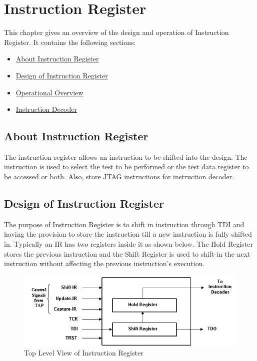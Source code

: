 \chapter{Instruction Register}
\label{chap:instruction-reg}
This chapter gives an overview of the design and operation of Instruction Register. It contains the following sections:
\begin{itemize}
    \item \hyperref[sec:about-instruction-reg]{About Instruction Register}
    \item \hyperref[sec:design-instruction-reg]{Design of Instruction Register}
    \item \hyperref[sec:operation-instruction-reg]{Operational Overview}
    \item \hyperref[sec:instruction-decoder]{Instruction Decoder}
\end{itemize}

\newpage

\section{About Instruction Register}
\label{sec:about-instruction-reg}
The instruction register allows an instruction to be shifted into the design. The instruction is used to select the test to be performed or the test data register to be accessed or both. Also, store JTAG instructions for instruction decoder.

\section{Design of Instruction Register}
\label{sec:design-instruction-reg}
The purpose of Instruction Register is to shift in instruction through TDI and having the provision to store the instruction till a new instruction is fully shifted in. Typically an IR has two registers inside it as shown below. The Hold Register stores the previous instruction and the Shift Register is used to shift-in the next instruction without affecting the previous instruction’s execution. 

\vspace{1cm}
\begin{figure}[H]
    \centering
    \includegraphics[width = 12cm]{images/instruction_register_top.png}
    \vspace{1cm}
    \caption{Top Level View of Instruction Register}
    \label{fig:instruction-reg-top}
\end{figure}
\vspace{1cm}

